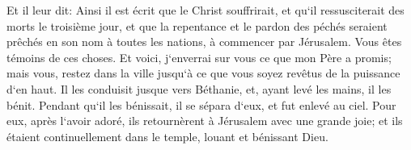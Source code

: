 \verse Et il leur dit: Ainsi il est écrit que le Christ souffrirait, et qu`il ressusciterait des morts le troisième jour, 
\verse et que la repentance et le pardon des péchés seraient prêchés en son nom à toutes les nations, à commencer par Jérusalem. 
\verse Vous êtes témoins de ces choses. 
\verse Et voici, j`enverrai sur vous ce que mon Père a promis; mais vous, restez dans la ville jusqu`à ce que vous soyez revêtus de la puissance d`en haut. 
\verse Il les conduisit jusque vers Béthanie, et, ayant levé les mains, il les bénit. 
\verse Pendant qu`il les bénissait, il se sépara d`eux, et fut enlevé au ciel. 
\verse Pour eux, après l`avoir adoré, ils retournèrent à Jérusalem avec une grande joie; 
\verse et ils étaient continuellement dans le temple, louant et bénissant Dieu. 
